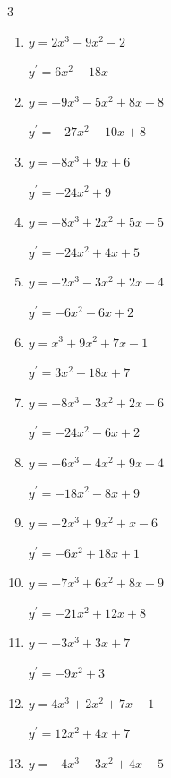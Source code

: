 \begin{multicols}{3}
\begin{enumerate}
        $\displaystyle y^{\prime}=-9x^{2}-14x+1$

  \item $y=2x^{3}-9x^{2}-2$

        $\displaystyle y^{\prime}=6x^{2}-18x$

  \item $y=-9x^{3}-5x^{2}+8x-8$

        $\displaystyle y^{\prime}=-27x^{2}-10x+8$

  \item $y=-8x^{3}+9x+6$

        $\displaystyle y^{\prime}=-24x^{2}+9$

  \item $y=-8x^{3}+2x^{2}+5x-5$

        $\displaystyle y^{\prime}=-24x^{2}+4x+5$

  \item $y=-2x^{3}-3x^{2}+2x+4$

        $\displaystyle y^{\prime}=-6x^{2}-6x+2$

  \item $y=x^{3}+9x^{2}+7x-1$

        $\displaystyle y^{\prime}=3x^{2}+18x+7$

  \item $y=-8x^{3}-3x^{2}+2x-6$

        $\displaystyle y^{\prime}=-24x^{2}-6x+2$

  \item $y=-6x^{3}-4x^{2}+9x-4$

        $\displaystyle y^{\prime}=-18x^{2}-8x+9$

  \item $y=-2x^{3}+9x^{2}+x-6$

        $\displaystyle y^{\prime}=-6x^{2}+18x+1$

  \item $y=-7x^{3}+6x^{2}+8x-9$

        $\displaystyle y^{\prime}=-21x^{2}+12x+8$

\columnbreak %

  \item $y=-3x^{3}+3x+7$

        $\displaystyle y^{\prime}=-9x^{2}+3$

  \item $y=4x^{3}+2x^{2}+7x-1$

        $\displaystyle y^{\prime}=12x^{2}+4x+7$

  \item $y=-4x^{3}-3x^{2}+4x+5$


\end{enumerate}
\end{multicols}
